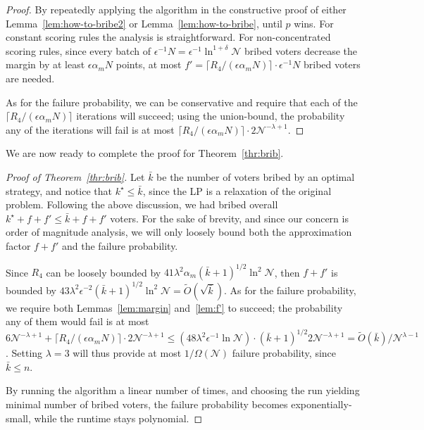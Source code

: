 \documentclass[letterpaper]{article} %
\newtheorem{corollary}[theorem]{Corollary}
\theoremstyle{definition}
\newcommand{\NN}{\mathcal{N}}
\newcommand\vecgreek{\bm}
\newcommand{\veca}{\vecgreek{\alpha}}
\newcommand{\Ra}{\mathcal{R}_{\veca}}
\begin{document}
\begin{proof}
	By repeatedly applying the algorithm in the constructive proof of either  Lemma~\ref{lem:how-to-bribe2} or Lemma~\ref{lem:how-to-bribe}, until $p$ wins. For constant scoring rules the analysis is straightforward. For non-concentrated scoring rules, since every batch of $\epsilon^{-1}N=\epsilon^{-1}\ln^{1+\delta}\NN$ bribed voters decrease the margin by at least $\epsilon \alpha_m N$ points, at most $f'=\lceil R_4/(\epsilon \alpha_m N)\rceil \cdot  \epsilon^{-1}N$ bribed voters are needed.
	
	As for the failure probability, we can be conservative and require that each of the $\lceil R_4/(\epsilon \alpha_m N)\rceil $ iterations will succeed; using the union-bound, the probability any of the iterations will fail is at most $\lceil R_4/(\epsilon \alpha_m N)\rceil \cdot 2\NN^{-\lambda+1}$.
\end{proof}
We are now ready to complete the proof for Theorem~\ref{thr:brib}. 
\begin{proof}[Proof of Theorem~\ref{thr:brib}]
	Let $\bar{k}$ be the number of voters bribed by an optimal strategy, and notice that $k^\star \leq \bar{k}$, since the LP is a relaxation of the original problem.
	Following  the above discussion, we had bribed overall $k^\star +f+f' \leq \bar{k} +f+f'$ voters. For the sake of brevity, and since our concern is order of magnitude analysis, we will only loosely bound both the approximation factor $f+f'$ and the failure probability. 
	
	Since $R_4$ can be loosely bounded by $41\lambda^2 \alpha_m  (\bar{k}+1)^{1/2}\ln^2 \NN $, then 
	$f+f'$ is bounded by $43\lambda^2 \epsilon^{-2} (\bar{k}+1)^{1/2} \ln^2 \NN = \widetilde{O}(\sqrt{\bar{k}})$. As for the failure probability, we require both Lemmas~\ref{lem:margin} and~\ref{lem:f'} to succeed; the probability any of them would fail is at most $6\NN^{-\lambda+1}+\lceil R_4/(\epsilon \alpha_m N)\rceil \cdot 2\NN^{-\lambda+1} \leq (48\lambda^2 \epsilon^{-1} \ln \NN) \cdot (\bar{k}+1)^{1/2}  2\NN^{-\lambda+1}=\widetilde{O}(\bar{k})/\NN^{\lambda-1}$. Setting $\lambda=3$ will thus provide at most $1/\Omega(\NN)$ failure probability, since $\bar{k} \leq n$.    
	
	By running the algorithm a linear number of times, and choosing the run yielding minimal number of bribed voters, the failure probability becomes exponentially-small, while the runtime stays polynomial.
\end{proof}
\end{document}
